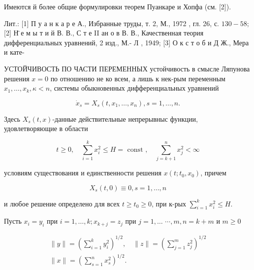 \documentclass[10pt]{article}
\begin{document}
Имеются й более общие формулировки теорем Пуанкаре и Хопфа (см. [2]).



Лит.: [1] П у а н к а р е А., Избранные труды, т. 2, М., 1972 , гл. 26, с. $130-58 ;$ [2] Н̈ е м ы т и й В. В., С т е II ан о в В. В., Качественная теория дифференциальных уравнений, 2 изд., М.- Л , 1949; [3] О к с т о б и Д Ж., Мера и кате-



УСТОЙЧИВОСТЬ ПО ЧАСТИ ПЕРЕМЕННЫХ устойчивость в смысле Ляпунова решения $x=0$ по отношению не ко всем, а лишь к нек-рым переменным $x_{1}, \ldots, x_{k}, \kappa<n$, системы обыкновенных дифференциальных уравнений



\[

\dot{x}_{s}=X_{s}\left(t, x_{1}, \ldots, x_{n}\right), s=1, \ldots, n .

\]



Здесь $X_{s}(t, x)$-данные действительные непрерывныс функции, удовлетворяющие в области



\[

t \geqslant 0, \quad \sum_{i=1}^{k} x_{i}^{2} \leqslant H=\text { const }, \quad \sum_{j=k+1}^{n} x_{j}^{2}<\infty

\]



условиям существования и единственности решения $x\left(t ; t_{0}, x_{0}\right)$, причем



\[

X_{s}(t, 0) \equiv 0, s=1, \ldots, n

\]



и любое решение определено для всех $t \geqslant t_{0} \geqslant 0$, при к-рых $\sum_{i=1}^{k} x_{i}^{2} \leqslant H$.



Пусть $x_{i}=y_{i}$ при $i=1, \ldots, k ; x_{k+j}=z_{j}$ при $j=1, \ldots$ $\cdots, m, n=k+m$ и $m \geqslant 0$



\[

\begin{gathered}

\|y\|=\left(\sum_{i=1}^{k} y_{i}^{2}\right)^{1 / 2}, \quad\|z\|=\left(\sum_{j=1}^{m} z_{j}^{2}\right)^{1 / 2} \\

\|x\|=\left(\sum_{s=1}^{n} x_{s}^{2}\right)^{1 / 2} .

\end{gathered}

\]
\end{document}
